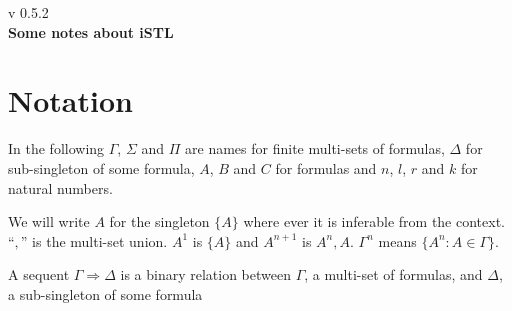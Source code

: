 \documentclass[a4paper, 12pt]{paper}
\begin{document}
{\noindent
	v 0.5.2 \\
{\large\textbf{Some notes about iSTL}}
}
\\
\setcounter{section}{-1}
\section{Notation} In the following $\Gamma$, $\Sigma$ and $\Pi$ are names for finite multi-sets of formulas, $\Delta$ for sub-singleton of some formula, $A$, $B$ and $C$ for formulas and $n$, $l$, $r$ and $k$ for natural numbers.

We will write $A$ for the singleton $\{A\}$ where ever it is inferable from the context.
``$,$'' is the multi-set union.
$A^1$ is $\{A\}$ and $A^{n+1}$ is $A^n, A$. $\Gamma^n$ means $\{ A^n : A \in \Gamma \}$.

A sequent $\Gamma \Rightarrow \Delta$ is a binary relation between $\Gamma$, a multi-set of formulas, and $\Delta$, a sub-singleton of some formula









\end{document}
